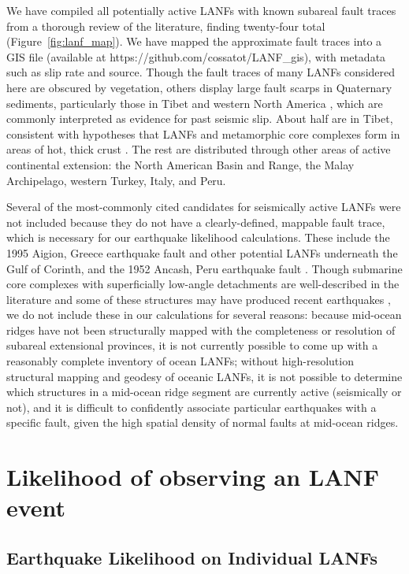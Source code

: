 \documentclass[draft,grl]{AGUTeX}
\begin{document}
\begin{article}
We have compiled all potentially active LANFs with known subareal fault traces
from a thorough review of the literature, finding twenty-four total
(Figure~\ref{fig:lanf_map}).  We have mapped the approximate fault traces into
a GIS file (available at https://github.com/cossatot/LANF\_gis), with metadata
such as slip rate and source. Though the fault traces of many LANFs considered
here are obscured by vegetation, others display large fault scarps in
Quaternary sediments, particularly those in Tibet
\citep[e.g.,][]{styron2013slr, kapp2005nqtl} and western North America
\citep[e.g.,][]{axen1999baja, hayman2003dv}, which are commonly interpreted as
evidence for past seismic slip.  About half are in Tibet, consistent with
hypotheses that LANFs and metamorphic core complexes form in areas of hot,
thick crust \citep [e.g.,][]{buck1991mcc}.  The rest are distributed through
other areas of active continental extension: the North American Basin and
Range, the Malay Archipelago, western Turkey, Italy, and Peru. 

Several of the most-commonly cited candidates for seismically active LANFs were
not included because they do not have a clearly-defined, mappable fault trace,
which is necessary for our earthquake likelihood calculations.  These include
the 1995 Aigion, Greece earthquake fault \citep{bernard1997} and other
potential LANFs underneath the Gulf of Corinth, and the 1952 Ancash, Peru
earthquake fault \citep{doser1987ancash}. Though submarine core complexes with
superficially low-angle detachments are well-described in the literature and
some of these structures may have produced recent earthquakes
\citep{abers2001}, we do not include these in our calculations for several
reasons: because mid-ocean ridges have not been structurally mapped with the
completeness or resolution of subareal extensional provinces, it is not
currently possible to come up with a reasonably complete inventory of ocean
LANFs; without high-resolution structural mapping and geodesy of oceanic LANFs,
it is not possible to determine which structures in a mid-ocean ridge segment
are currently active (seismically or not), and it is difficult to confidently
associate particular earthquakes with a specific fault, given the high spatial
density of normal faults at mid-ocean ridges.


\section{Likelihood of observing an LANF event}
\subsection{Earthquake Likelihood on Individual LANFs}


\end{article}
\end{document}
